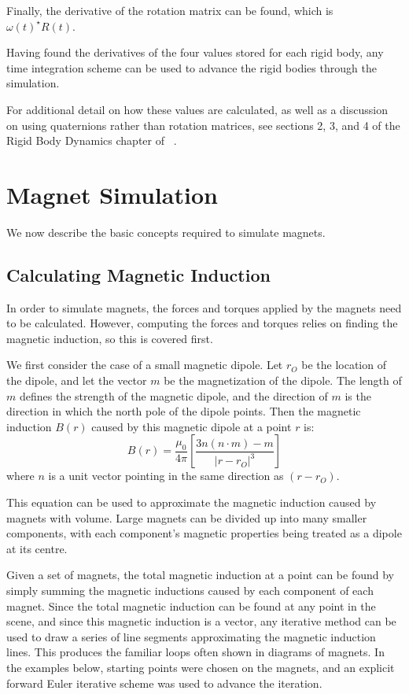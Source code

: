 \documentclass[tog]{acmsiggraph}
\begin{document}
Finally, the derivative of the rotation matrix can be found, which is $\omega(t)^{\star}R(t)$.

Having found the derivatives of the four values stored for each rigid body, any time integration scheme can be used to advance the rigid bodies through the simulation.

For additional detail on how these values are calculated, as well as a discussion on using quaternions rather than rotation matrices, see sections 2, 3, and 4 of the Rigid Body Dynamics chapter of ~\cite{pixarnotes}.

\section{Magnet Simulation}

We now describe the basic concepts required to simulate magnets.

\subsection{Calculating Magnetic Induction}

In order to simulate magnets, the forces and torques applied by the magnets need to be calculated. However, computing the forces and torques relies on finding the magnetic induction, so this is covered first.

We first consider the case of a small magnetic dipole. Let $r_O$ be the location of the dipole, and let the vector $m$ be the magnetization of the dipole. The length of $m$ defines the strength of the magnetic dipole, and the direction of $m$ is the direction in which the north pole of the dipole points. Then the magnetic induction $B(r)$ caused by this magnetic dipole at a point $r$ is:
\begin{equation}
B(r) = \frac{\mu_0}{4\pi}\left[\frac{3n(n\cdot m) - m}{\left|r - r_O\right|^3}\right]
\end{equation}
where $n$ is a unit vector pointing in the same direction as $(r - r_O)$.

This equation can be used to approximate the magnetic induction caused by magnets with volume. Large magnets can be divided up into many smaller components, with each component's magnetic properties being treated as a dipole at its centre.

Given a set of magnets, the total magnetic induction at a point can be found by simply summing the magnetic inductions caused by each component of each magnet. Since the total magnetic induction can be found at any point in the scene, and since this magnetic induction is a vector, any iterative method can be used to draw a series of line segments approximating the magnetic induction lines. This produces the familiar loops often shown in diagrams of magnets. In the examples below, starting points were chosen on the magnets, and an explicit forward Euler iterative scheme was used to advance the iteration.
\end{document}
